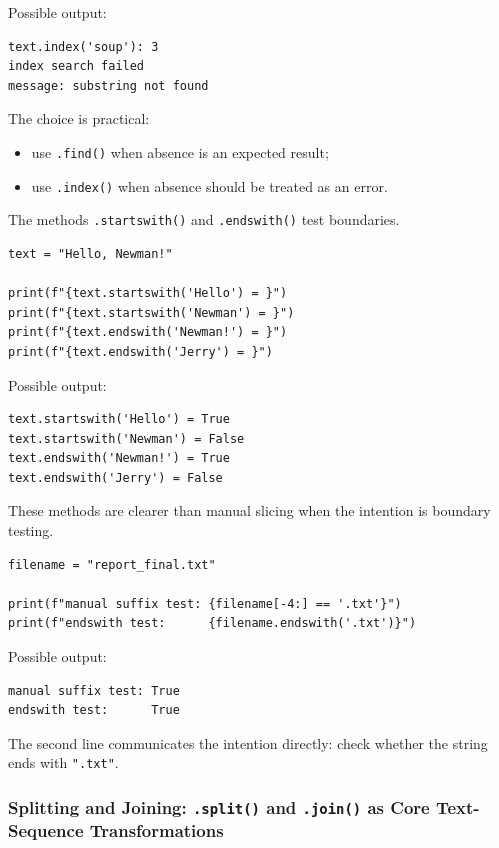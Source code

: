 Possible output:

\begin{verbatim}
text.index('soup'): 3
index search failed
message: substring not found
\end{verbatim}

The choice is practical:

\begin{itemize}
    \item use \texttt{.find()} when absence is an expected result;
    \item use \texttt{.index()} when absence should be treated as an error.
\end{itemize}

The methods \texttt{.startswith()} and \texttt{.endswith()} test boundaries.

\begin{verbatim}
text = "Hello, Newman!"

print(f"{text.startswith('Hello') = }")
print(f"{text.startswith('Newman') = }")
print(f"{text.endswith('Newman!') = }")
print(f"{text.endswith('Jerry') = }")
\end{verbatim}

Possible output:

\begin{verbatim}
text.startswith('Hello') = True
text.startswith('Newman') = False
text.endswith('Newman!') = True
text.endswith('Jerry') = False
\end{verbatim}

These methods are clearer than manual slicing when the intention is boundary testing.

\begin{verbatim}
filename = "report_final.txt"

print(f"manual suffix test: {filename[-4:] == '.txt'}")
print(f"endswith test:      {filename.endswith('.txt')}")
\end{verbatim}

Possible output:

\begin{verbatim}
manual suffix test: True
endswith test:      True
\end{verbatim}

The second line communicates the intention directly: check whether the string ends with \texttt{".txt"}.

\subsubsection{Splitting and Joining: \texttt{.split()} and \texttt{.join()} as Core Text-Sequence Transformations}

